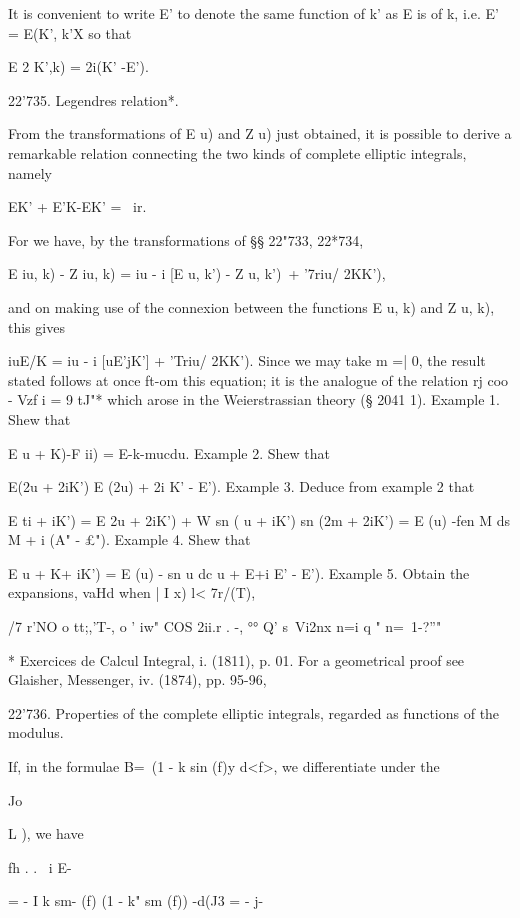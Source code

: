 It is convenient to write E' to denote the same function of k' as E is
of k, i.e. E' = E(K', k'X so that

E 2 K',k) = 2i(K' -E').

22'735. Legendres relation*.

From the transformations of E u) and Z u) just obtained, it is
possible to derive a remarkable relation connecting the two kinds of
complete elliptic integrals, namely

EK' + E'K-EK' = \ ir.

For we have, by the transformations of §§ 22"733, 22*734,

E iu, k) - Z iu, k) = iu - i [E u, k') - Z u, k')\ + '7riu/ 2KK'),

and on making use of the connexion between the functions E u, k) and Z
u, k), this gives

iuE/K = iu - i [uE'jK'] + 'Triu/ 2KK'). Since we may take m =| 0, the
result stated follows at once ft-om this equation; it is the analogue
of the relation rj coo - Vzf i = 9 tJ"* which arose in the
Weierstrassian theory (§ 2041 1). Example 1. Shew that

E u + K)-F ii) = E-k-mucdu. Example 2. Shew that

E(2u + 2iK') E (2u) + 2i K' - E'). Example 3. Deduce from example 2
that

E ti + iK') = E 2u + 2iK') + W sn ( u + iK') sn (2m + 2iK') = E (u)
-fen M ds M + i (A" - £"). Example 4. Shew that

E u + K+ iK') = E (u) - sn u dc u + E+i E' - E'). Example 5. Obtain
the expansions, vaHd when | I x) l< 7r/(T),

/7 r'NO o tt;,'T-, o ' iw" COS 2ii.r . -, °° Q' s\ Vi2nx n=i q " n=\
1-?''"


* Exercices de Calcul Integral, i. (1811), p. 01. For a geometrical
proof see Glaisher, Messenger, iv. (1874), pp. 95-96,

%
%

22'736. Properties of the complete elliptic integrals, regarded as
functions of the modulus.

If, in the formulae B=\ (1 - k sin (f)y d<f>, we differentiate under
the

Jo

L ), we have

fh . . \ i E-

= - I k sm- (f) (1 - k" sm (f)) -d(J3 = - j-

